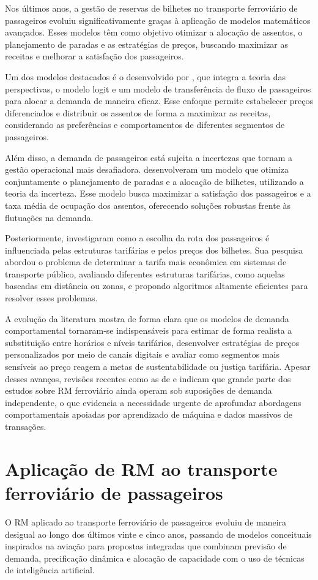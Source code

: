 Nos últimos anos, a gestão de reservas de bilhetes no transporte ferroviário de passageiros evoluiu significativamente graças à aplicação de modelos matemáticos avançados. Esses modelos têm como objetivo otimizar a alocação de assentos, o planejamento de paradas e as estratégias de preços, buscando maximizar as receitas e melhorar a satisfação dos passageiros.

Um dos modelos destacados é o desenvolvido por \citet{zhou2023pricing}, que integra a teoria das perspectivas, o modelo logit e um modelo de transferência de fluxo de passageiros para alocar a demanda de maneira eficaz. Esse enfoque permite estabelecer preços diferenciados e distribuir os assentos de forma a maximizar as receitas, considerando as preferências e comportamentos de diferentes segmentos de passageiros.

Além disso, a demanda de passageiros está sujeita a incertezas que tornam a gestão operacional mais desafiadora. \citet{han2020uncertainty} desenvolveram um modelo que otimiza conjuntamente o planejamento de paradas e a alocação de bilhetes, utilizando a teoria da incerteza. Esse modelo busca maximizar a satisfação dos passageiros e a taxa média de ocupação dos assentos, oferecendo soluções robustas frente às flutuações na demanda.

Posteriormente, \citet{schoebel2021tariff} investigaram como a escolha da rota dos passageiros é influenciada pelas estruturas tarifárias e pelos preços dos bilhetes. Sua pesquisa abordou o problema de determinar a tarifa mais econômica em sistemas de transporte público, avaliando diferentes estruturas tarifárias, como aquelas baseadas em distância ou zonas, e propondo algoritmos altamente eficientes para resolver esses problemas.

A evolução da literatura mostra de forma clara que os modelos de demanda comportamental tornaram-se indispensáveis para estimar de forma realista a substituição entre horários e níveis tarifários, desenvolver estratégias de preços personalizados por meio de canais digitais e avaliar como segmentos mais sensíveis ao preço reagem a metas de sustentabilidade ou justiça tarifária. Apesar desses avanços, revisões recentes como as de \citet{Ammirato2020} e \citet{Besinovic2022} indicam que grande parte dos estudos sobre RM ferroviário ainda operam sob suposições de demanda independente, o que evidencia a necessidade urgente de aprofundar abordagens comportamentais apoiadas por aprendizado de máquina e dados massivos de transações.

\section{Aplicação de RM ao transporte ferroviário de passageiros}
O RM aplicado ao transporte ferroviário de passageiros evoluiu de maneira desigual ao longo dos últimos vinte e cinco anos, passando de modelos conceituais inspirados na aviação para propostas integradas que combinam previsão de demanda, precificação dinâmica e alocação de capacidade com o uso de técnicas de inteligência artificial.

